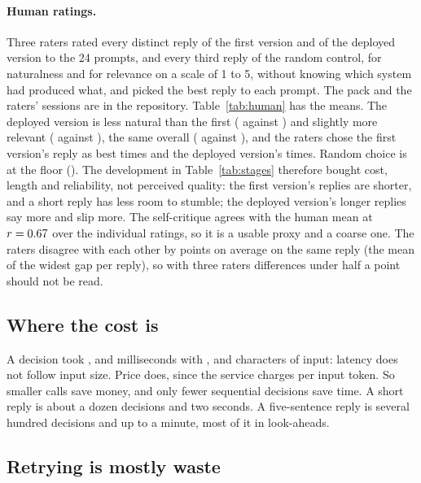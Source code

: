 \documentclass[10pt,twocolumn]{article}
\begin{document}
\paragraph{Human ratings.} Three raters rated every distinct reply of the first version and of the
deployed version to the 24 prompts, and
every third reply of the random control, for naturalness and for relevance on a scale of 1 to 5,
without knowing which system had produced what, and picked the best reply to each prompt. The pack
and the raters' sessions are in the repository. Table~\ref{tab:human} has the means. The deployed
version is less natural than the first (\HumanDepNat{} against \HumanBaseNat{}) and slightly more
relevant (\HumanDepRel{} against \HumanBaseRel{}), the same overall (\HumanDepMean{} against
\HumanBaseMean{}), and the raters chose the first version's reply as best \PrefBase{} times and the
deployed version's \PrefDep{} times. Random choice is at the floor (\HumanRandMean{}). The development in
Table~\ref{tab:stages} therefore bought cost, length and reliability, not perceived quality: the
first version's replies are shorter, and a short reply has less room to stumble; the deployed
version's longer replies say more and slip more. The self-critique agrees with the human mean at
$r = 0.67$ over the individual ratings, so it is a usable proxy and a coarse one. The raters
disagree with each other by \HumanSpread{} points on average on the same reply (the mean of the
widest gap per reply), so with three raters differences under half a point should not be read.

\subsection{Where the cost is}\label{sec:cost}

A decision took \WinFullMs{}, \WinEightMs{} and \WinThreeMs{} milliseconds with \WinFullChars{},
\WinEightChars{} and \WinThreeChars{} characters of input: latency does not follow input size.
Price does, since the service charges per input token. So smaller calls save money, and only fewer
sequential decisions save time. A short reply is about a dozen decisions and two seconds. A
five-sentence reply is several hundred decisions and up to a minute, most of it in look-aheads.

\subsection{Retrying is mostly waste}
\end{document}
